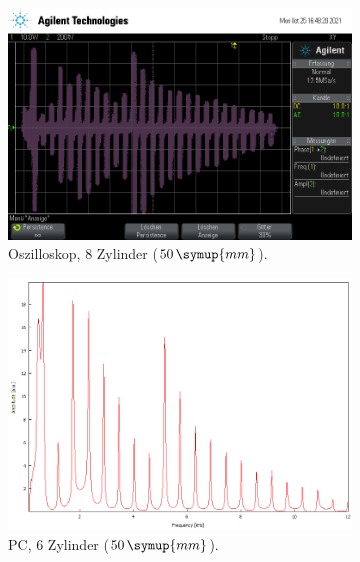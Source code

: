 \begin{figure}
\begin{subfigure}[b]{0.3\textwidth}
        \includegraphics[width=\textwidth]{data/1_1zylinder50mm/scope_8.png}
        \caption{Oszilloskop, 8 Zylinder ($50 \, \symup{mm}$).}
    \end{subfigure}
    \hfill
    \begin{subfigure}[b]{0.3\textwidth}
        \centering
        \includegraphics[width=\textwidth]{data/1_2zylinder50mmPC/6.png}
        \caption{PC, 6 Zylinder ($50 \, \symup{mm}$).}
    \end{subfigure}
    \hfill
    \begin{subfigure}[b]{0.3\textwidth}
        \centering

\end{subfigure}
\end{figure}
